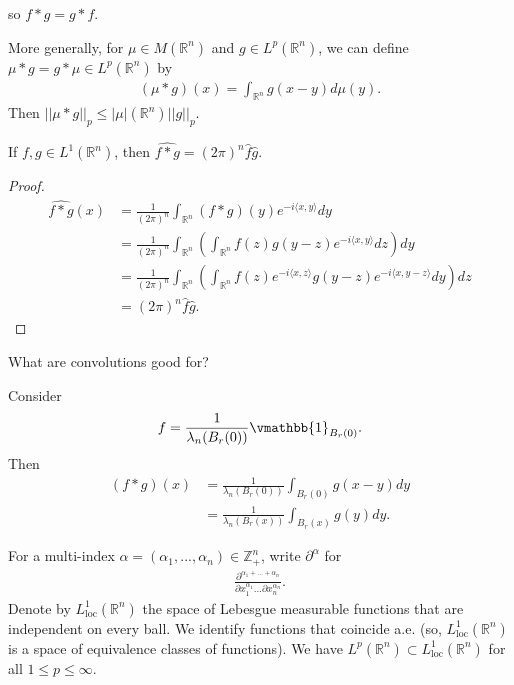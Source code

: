 so \(f\ast g= g\ast f\).
\begin{remark}
    More generally, for \(\mu\in M(\mathbb{R}^n)\) and \(g\in L^p(\mathbb{R}^n)\), we can define \(\mu\ast g = g\ast\mu\in L^p(\mathbb{R}^n)\) by 
    \begin{align*}
        (\mu\ast g)(x) = \int_{\mathbb{R}^n} g(x-y)d\mu(y).
    \end{align*}
    Then \(||\mu\ast g||_p\leq |\mu|(\mathbb{R}^n)||g||_p\).
\end{remark}
\begin{proposition}
    If \(f,g\in L^1(\mathbb{R}^n)\), then \(\hat{f\ast g} = (2\pi)^n\hat{f}\hat{g}\).
\end{proposition}
\ifdetailed 
\begin{proof}
    \begin{align*}
        \hat{f\ast g}(x) &= \frac{1}{(2\pi)^n}\int_{\mathbb{R}^n} (f\ast g)(y) e^{-i\langle x,y\rangle}dy \\
        &= \frac{1}{(2\pi)^n}\int_{\mathbb{R}^n}\left(\int_{\mathbb{R}^n} f(z)g(y-z)e^{-i\langle x,y\rangle}dz\right)dy \\
        &= \frac{1}{(2\pi)^n}\int_{\mathbb{R}^n}\left(\int_{\mathbb{R}^n} f(z)e^{-i\langle x,z\rangle}g(y-z)e^{-i\langle x, y-z\rangle}dy\right)dz \\
        &= (2\pi)^n \hat{f}\hat{g}.
    \end{align*}
\end{proof}
\fi 
What are convolutions good for?
\begin{example}
    Consider
    \begin{align*}
        f = \frac{1}{\lambda_n(B_r(0))} \vmathbb{1}_{B_r(0)}.
    \end{align*}
    Then
    \begin{align*}
        (f\ast g)(x) &= \frac{1}{\lambda_n(B_r(0))}\int_{B_r(0)}g(x-y)dy \\
        &= \frac{1}{\lambda_n(B_r(x))}\int_{B_r(x)} g(y)dy.
    \end{align*}
\end{example}

For a multi-index \(\alpha = (\alpha_1, ..., \alpha_n)\in\mathbb{Z}^{n}_{+}\), write \(\partial^{\alpha}\) for 
\begin{align*}
    \frac{\partial^{\alpha_1 + ... + \alpha_n}}{\partial x^{\alpha_1}_{1}...\partial x^{\alpha_n}_{n}}.
\end{align*}
Denote by \(L^{1}_{\text{loc}}(\mathbb{R}^n)\) the space of Lebesgue measurable functions that are independent on every ball. We identify functions that coincide a.e. (so, \(L^{1}_{\text{loc}}(\mathbb{R}^n)\) is a space of equivalence classes of functions). We have \(L^p(\mathbb{R}^n) \subset L^{1}_{\text{loc}}(\mathbb{R}^n)\) for all \(1\leq p\leq \infty\).

